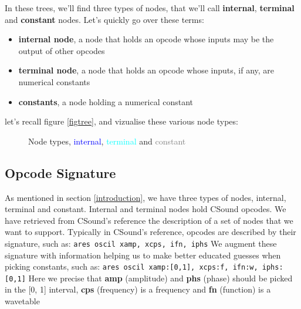 \documentclass{article}
\newcommand{\code}[1]{\texttt{#1}}
\begin{document}
In these trees, we'll find three types of nodes, that we'll call \textbf{internal}, \textbf{terminal} and \textbf{constant} nodes. Let's quickly go over these terms:
\begin{itemize}
    \item \textbf{internal node}, a node that holds an opcode whose inputs may be the output of other opcodes
    \item \textbf{terminal node}, a node that holds an opcode whose inputs, if any, are numerical constants
    \item \textbf{constants}, a node holding a numerical constant
\end{itemize}

let's recall figure \ref{figtree}, and vizualise these various node types:

\begin{figure}[H]
    \centering
    \caption{Node types, \textcolor{blue}{internal}, \textcolor{cyan}{terminal} and \textcolor{gray}{constant}}
\end{figure}%

\subsection{Opcode Signature}

As mentioned in section \ref{introduction}, we have three types of nodes, internal, terminal and constant. Internal and terminal nodes hold CSound opcodes. We have retrieved from CSound's reference the description of a set of nodes that we want to support. Typically in CSound's reference, opcodes are described by their signature, such as: \newline
\code{ares oscil  xamp, xcps, ifn, iphs}\newline
We augment these signature with information helping us to make better educated guesses when picking constants, such as:\newline
\code{ares oscil  xamp:[0,1], xcps:f, ifn:w, iphs:[0,1]} \newline
Here we precise that \textbf{amp} (amplitude) and \textbf{phs} (phase) should be picked in the [0, 1] interval, \textbf{cps} (frequency) is a frequency and \textbf{fn} (function) is a wavetable
\end{document}
